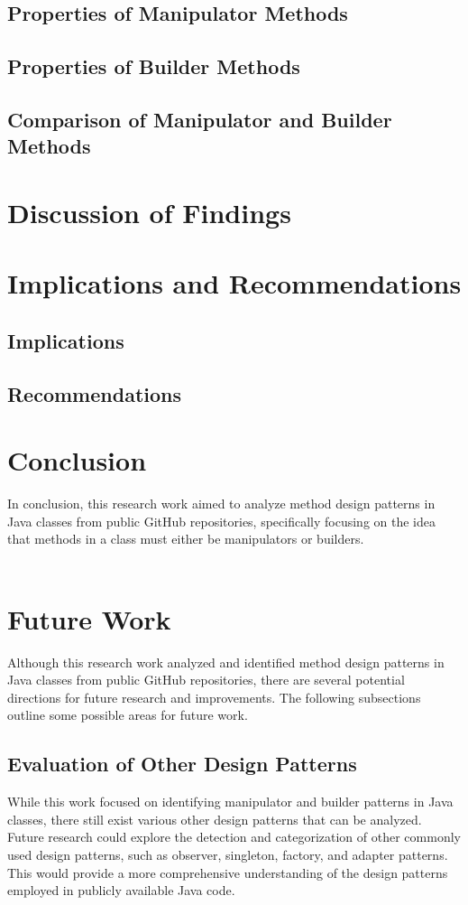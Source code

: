 \documentclass[draft]{article}
\begin{document}
\subsection{Properties of Manipulator Methods}
\subsection{Properties of Builder Methods}
\subsection{Comparison of Manipulator and Builder Methods}

\newpage
\section{Discussion of Findings}

\newpage
\section{Implications and Recommendations}
\subsection{Implications}
\subsection{Recommendations}

\newpage
\section{Conclusion}
In conclusion, this research work aimed to analyze method design patterns in Java classes from public GitHub repositories, specifically focusing on the idea that methods in a class must either be manipulators or builders.\\
~\\


\newpage
\section{Future Work}
Although this research work analyzed and identified method design patterns in Java classes from public GitHub repositories, there are several potential directions for future research and improvements. The following subsections outline some possible areas for future work.
\subsection{Evaluation of Other Design Patterns}
While this work focused on identifying manipulator and builder patterns in Java classes, there still exist various other design patterns that can be analyzed. Future research could explore the detection and categorization of other commonly used design patterns, such as observer, singleton, factory, and adapter patterns. This would provide a more comprehensive understanding of the design patterns employed in publicly available Java code.
\end{document}
